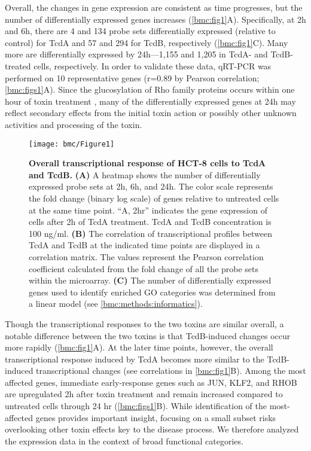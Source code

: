 Overall, the changes in gene expression are consistent as time progresses, but the number of differentially expressed genes increases (\autoref{bmc:fig1}A). Specifically, at 2h and 6h, there are 4 and 134 probe sets differentially expressed (relative to control) for TcdA and 57 and 294 for TcdB, respectively (\autoref{bmc:fig1}C).  Many more are differentially expressed by 24h—1,155 and 1,205 in TcdA- and TcdB-treated cells, respectively. In order to validate these data, qRT-PCR was performed on 10 representative genes (r=0.89 by Pearson correlation; \autoref{bmc:figs1}A). Since the glucosylation of Rho family proteins occurs within one hour of toxin treatment \cite{ChavesOlarte:1997cs}, many of the differentially expressed genes at 24h may reflect secondary effects from the initial toxin action or possibly other unknown activities and processing of the toxin.

\begin{figure}[h!]
  \centering
  \texttt{[image: bmc/Figure1]}
  \caption[Overall transcriptional response of HCT-8 cells to TcdA and TcdB]{
       \textbf{Overall transcriptional response of HCT-8 cells to TcdA and TcdB.}
       \textbf{(A)} A heatmap shows the number of differentially expressed probe sets at 2h, 6h, and 24h. The color scale represents the fold change (binary log scale) of genes relative to untreated cells at the same time point. ``A, 2hr'' indicates the gene expression of cells after 2h of TcdA treatment. TcdA and TcdB concentration is 100 ng/ml.
       \textbf{(B)} The correlation of transcriptional profiles between TcdA and TcdB at the indicated time points are displayed in a correlation matrix. The values represent the Pearson correlation coefficient calculated from the fold change of all the probe sets within the microarray.
       \textbf{(C)} The number of differentially expressed genes used to identify enriched GO categories was determined from a linear model (see \ref{bmc:methods:informatics}).
}
  \label{bmc:fig1}
\end{figure}

Though the transcriptional responses to the two toxins are similar overall, a notable difference between the two toxins is that TcdB-induced changes occur more rapidly (\autoref{bmc:fig1}A). At the later time points, however, the overall transcriptional response induced by TcdA becomes more similar to the TcdB-induced transcriptional changes (see correlations in \autoref{bmc:fig1}B). Among the most affected genes, immediate early-response genes such as JUN, KLF2, and RHOB are upregulated 2h after toxin treatment and remain increased compared to untreated cells through 24 hr (\autoref{bmc:figs1}B). While identification of the most-affected genes provides important insight, focusing on a small subset risks overlooking other toxin effects key to the disease process. We therefore analyzed the expression data in the context of broad functional categories.

